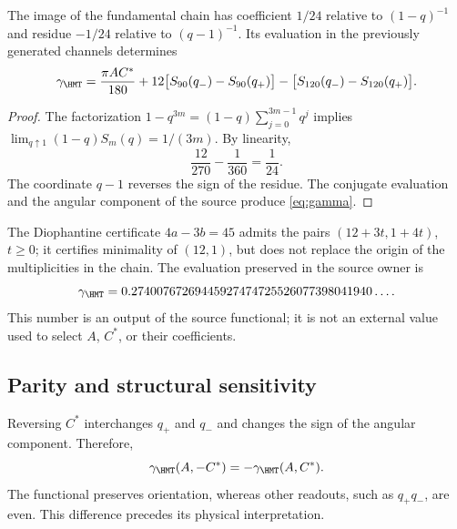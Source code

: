 \begin{theorem}
The image of the fundamental chain has coefficient $1/24$
relative to $(1-q)^{-1}$ and residue $-1/24$ relative to $(q-1)^{-1}$.
Its evaluation in the previously generated channels determines
\begin{equation}
\gamma_{\HMT}=
\frac{\pi AC^*}{180}
+12\bigl[S_{90}(q_-)-S_{90}(q_+)\bigr]
-\bigl[S_{120}(q_-)-S_{120}(q_+)\bigr].
\label{eq:gamma}
\end{equation}
\end{theorem}
\begin{proof}
The factorization $1-q^{3m}=(1-q)\sum_{j=0}^{3m-1}q^j$ implies
$\lim_{q\uparrow1}(1-q)S_m(q)=1/(3m)$. By linearity,
\[
\frac{12}{270}-\frac1{360}=\frac1{24}.
\]
The coordinate $q-1$ reverses the sign of the residue.
The conjugate evaluation and the angular component of the source
produce \eqref{eq:gamma}.
\end{proof}

The Diophantine certificate $4a-3b=45$ admits the pairs
$(12+3t,1+4t)$, $t\ge0$; it certifies minimality of $(12,1)$,
but does not replace the origin of the multiplicities in the chain.
The evaluation preserved in the source owner is
\[
\gamma_{\HMT}
=0.27400767269445927474725526077398041940\ldots.
\]
This number is an output of the source functional; it is not an external value
used to select $A$, $C^*$, or their coefficients.

\subsection{Parity and structural sensitivity}
Reversing $C^*$ interchanges $q_+$ and $q_-$ and changes the sign of
the angular component. Therefore,
\[
\gamma_{\HMT}(A,-C^*)=-\gamma_{\HMT}(A,C^*).
\]
The functional preserves orientation, whereas other readouts,
such as $q_+q_-$, are even. This difference precedes its physical interpretation.
